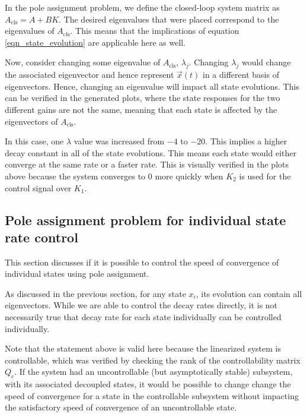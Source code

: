 \documentclass[10pt]{article}
\begin{document}
In the pole assignment problem, we define the closed-loop system matrix as $A_\text{cls} = A+BK$. The desired eigenvalues that were placed correspond to the eigenvalues of $A_\text{cls}$. This means that the implications of equation \ref{eqn_state_evolution} are applicable here as well. 

Now, consider changing some eigenvalue of $A_\text{cls}$, $\lambda_j$. Changing $\lambda_j$ would change the associated eigenvector and hence represent $\vec{x}(t)$ in a different basis of eigenvectors. Hence, changing an eigenvalue will impact all state evolutions. This can be verified in the generated plots, where the state responses for the two different gains are not the same, meaning that each state is affected by the eigenvectors of $A_\text{cls}$. 

In this case, one $\lambda$ value was increased from $-4$ to $-20$. This implies a higher decay constant in all of the state evolutions. This means each state would either converge at the same rate or a faster rate. This is visually verified in the plots above because the system converges to 0 more quickly when $K_2$ is used for the control signal over $K_1$.

\subsection{Pole assignment problem for individual state rate control}
This section discusses if it is possible to control the speed of convergence of individual states using pole assignment. 

As discussed in the previous section, for any state $x_i$, its evolution can contain all eigenvectors. While we are able to control the decay rates directly, it is not necessarily true that decay rate for each state individually can be controlled individually. 

Note that the statement above is valid here because the linearized system is controllable, which was verified by checking the rank of the controllability matrix $Q_c$. If the system had an uncontrollable (but asymptotically stable) subsystem, with its associated decoupled states, it would be possible to change change the speed of convergence for a state in the controllable subsystem without impacting the satisfactory speed of convergence of an uncontrollable state. 
\end{document}
